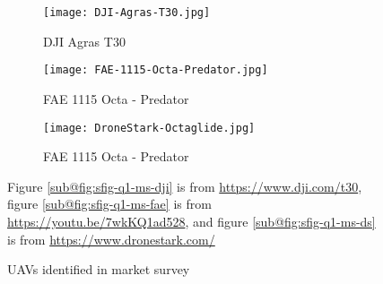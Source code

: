 \begin{figure}[t]
    \centering
    \begin{subfigure}[b]{0.3\textwidth}
        \centering
        \texttt{[image: DJI-Agras-T30.jpg]}
        \caption{DJI Agras T30}
        \label{fig:sfig-q1-ms-dji}
    \end{subfigure}
    \begin{subfigure}[b]{0.3\textwidth}
        \centering
        \texttt{[image: FAE-1115-Octa-Predator.jpg]}
        \caption{FAE 1115 Octa - Predator}
        \label{fig:sfig-q1-ms-fae}
    \end{subfigure}
    \begin{subfigure}[b]{0.3\textwidth}
        \centering
        \texttt{[image: DroneStark-Octaglide.jpg]}
        \caption{FAE 1115 Octa - Predator}
        \label{fig:sfig-q1-ms-ds}
    \end{subfigure}
    \caption{UAVs identified in market survey}
    \label{fig:q1-market-survey}
    \small
        Figure \ref{sub@fig:sfig-q1-ms-dji} is from \url{https://www.dji.com/t30}, figure \ref{sub@fig:sfig-q1-ms-fae} is from \url{https://youtu.be/7wkKQ1ad528}, and figure \ref{sub@fig:sfig-q1-ms-ds} is from \url{https://www.dronestark.com/}
\end{figure}


